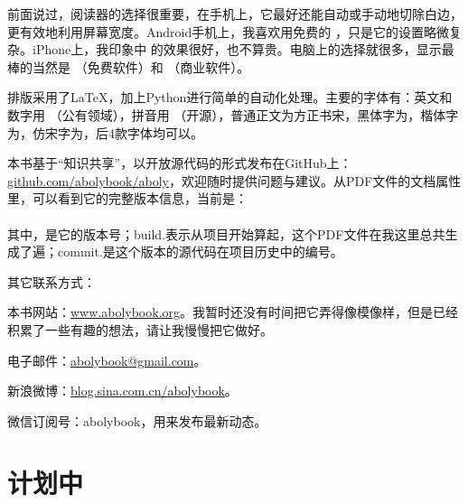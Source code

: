 前面说过，阅读器的选择很重要，在手机上，它最好还能自动或手动地切除白边，更有效地利用屏幕宽度。Android手机上，我喜欢用免费的 ，只是它的设置略微复杂。iPhone上，我印象中  的效果很好，也不算贵。电脑上的选择就很多，显示最棒的当然是 （免费软件）和 （商业软件）。

排版采用了LaTeX，加上Python进行简单的自动化处理。主要的字体有：英文和数字用 （公有领域），拼音用 （开源），普通正文为方正书宋，黑体字为，楷体字为，仿宋字为，后4款字体均可以。

本书基于“知识共享”，以开放源代码的形式发布在GitHub上：\href{https://github.com/abolybook/aboly}{github.com/abolybook/aboly}，欢迎随时提供问题与建议。从PDF文件的文档属性里，可以看到它的完整版本信息，当前是：\\
\versioninfoaboly\\
其中，\projectversionnumber 是它的版本号；build.\buildnoaboly 表示从项目开始算起，这个PDF文件在我这里总共生成了\buildnoaboly 遍；commit.\lycommitno 是这个版本的源代码在项目历史中的编号。

其它联系方式：
\begin{lyitemize}
\item 本书网站：\href{http://www.abolybook.org/}{www.abolybook.org}。我暂时还没有时间把它弄得像模像样，但是已经积累了一些有趣的想法，请让我慢慢把它做好。
\item 电子邮件：\href{mailto:abolybook@gmail.com}{abolybook@gmail.com}。
\item 新浪微博：\href{http://blog.sina.com.cn/abolybook}{blog.sina.com.cn/abolybook}。
\item 微信订阅号：abolybook，用来发布最新动态。
\end{lyitemize}


\lypdfbookmark\section*{计划中}

